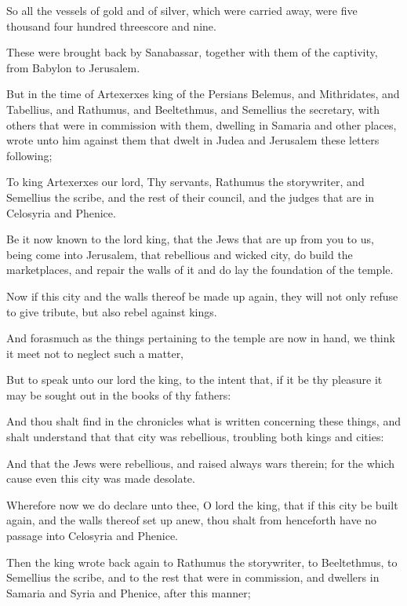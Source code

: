 {\par }{\PP {}So all the vessels of gold and of silver, which were carried away, were five thousand four hundred threescore and nine.
\par }{\PP {}These were brought back by Sanabassar, together with them of the captivity, from Babylon to Jerusalem.
\par }{\PP {}But in the time of Artexerxes king of the Persians Belemus, and Mithridates, and Tabellius, and Rathumus, and Beeltethmus, and Semellius the secretary, with others that were in commission with them, dwelling in Samaria and other places, wrote unto him against them that dwelt in Judea and Jerusalem these letters following;
\par }{\PP {}To king Artexerxes our lord, Thy servants, Rathumus the storywriter, and Semellius the scribe, and the rest of their council, and the judges that are in Celosyria and Phenice.
\par }{\PP {}Be it now known to the lord king, that the Jews that are up from you to us, being come into Jerusalem, that rebellious and wicked city, do build the marketplaces, and repair the walls of it and do lay the foundation of the temple.
\par }{\PP {}Now if this city and the walls thereof be made up again, they will not only refuse to give tribute, but also rebel against kings.
\par }{\PP {}And forasmuch as the things pertaining to the temple are now in hand, we think it meet not to neglect such a matter,
\par }{\PP {}But to speak unto our lord the king, to the intent that, if it be thy pleasure it may be sought out in the books of thy fathers:
\par }{\PP {}And thou shalt find in the chronicles what is written concerning these things, and shalt understand that that city was rebellious, troubling both kings and cities:
\par }{\PP {}And that the Jews were rebellious, and raised always wars therein; for the which cause even this city was made desolate.
\par }{\PP {}Wherefore now we do declare unto thee, O lord the king, that if this city be built again, and the walls thereof set up anew, thou shalt from henceforth have no passage into Celosyria and Phenice.
\par }{\PP {}Then the king wrote back again to Rathumus the storywriter, to Beeltethmus, to Semellius the scribe, and to the rest that were in commission, and dwellers in Samaria and Syria and Phenice, after this manner;
}
